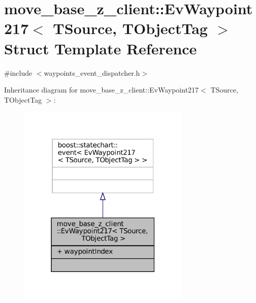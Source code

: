 \hypertarget{structmove__base__z__client_1_1EvWaypoint217}{}\section{move\+\_\+base\+\_\+z\+\_\+client\+:\+:Ev\+Waypoint217$<$ T\+Source, T\+Object\+Tag $>$ Struct Template Reference}
\label{structmove__base__z__client_1_1EvWaypoint217}


{\ttfamily \#include $<$waypoints\+\_\+event\+\_\+dispatcher.\+h$>$}



Inheritance diagram for move\+\_\+base\+\_\+z\+\_\+client\+:\+:Ev\+Waypoint217$<$ T\+Source, T\+Object\+Tag $>$\+:
\nopagebreak
\begin{figure}[H]
\begin{center}
\leavevmode
\includegraphics[width=232pt]{structmove__base__z__client_1_1EvWaypoint217__inherit__graph}
\end{center}
\end{figure}


